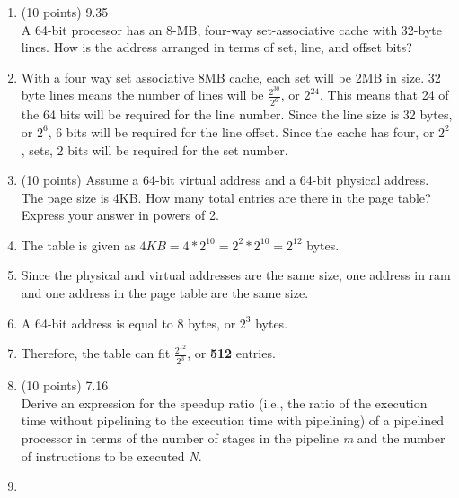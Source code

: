 \documentclass[letterpaper,10pt,onecolumn,titlepage]{article}
\begin{document}
\begin{enumerate}
\item (10 points) 9.35 \\
	A 64-bit processor has an 8-MB, four-way set-associative cache with 32-byte lines.
	How is the address arranged in terms of set, line, and offset bits?
\item[\textbullet] With a four way set associative 8MB cache, each set will be 2MB in
	size. 32 byte lines means the number of lines will be $\frac{2^{30}}{2^{6}}$, or
	$2^{24}$. This means that 24 of the 64 bits will be required for the line number.
	Since the line size is 32 bytes, or $2^{6}$, 6 bits will be required for the line
	offset. Since the cache has four, or $2^{2}$, sets, 2 bits will be required for
	the set number.

\item (10 points) Assume a 64-bit virtual address and a 64-bit physical address. The page
	size is 4KB. How many total entries are there in the page table? Express your
	answer in powers of 2.
\item[\textbullet] The table is given as $4KB = 4*2^{10} = 2^{2}*2^{10} = 2^{12}$ bytes.
\item[\textbullet] Since the physical and virtual addresses are the same size, one address
	in ram and one address in the page table are the same size.
\item[\textbullet] A 64-bit address is equal to 8 bytes, or $2^{3}$ bytes.
\item[\textbullet] Therefore, the table can fit $\frac{2^{12}}{2^{3}}$, or \textbf{512}
	entries.

\item (10 points) 7.16  \\
	Derive an expression for the speedup ratio (i.e., the ratio of the execution time
	without pipelining to the execution time with pipelining) of a pipelined processor
	in terms of the number of stages in the pipeline \textit{m} and the number of
	instructions to be executed \textit{N}.
\item[\textbullet] 


\end{enumerate}
\end{document}
